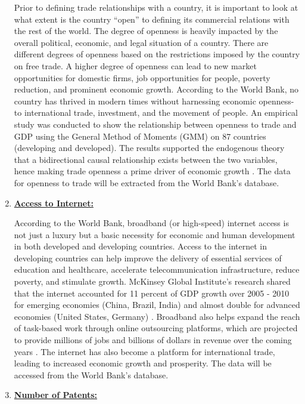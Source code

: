 \begin{enumerate}
Prior to defining trade relationships with a country, it is important to look at what extent is the country “open” to defining its commercial relations with the rest of the world. The degree of openness is heavily impacted by the overall political, economic, and legal situation of a country. There are different degrees of openness based on the restrictions imposed by the country on free trade. A higher degree of openness can lead to new market opportunities for domestic firms, job opportunities for people, poverty reduction, and prominent economic growth. According to the World Bank, no country has thrived in modern times without harnessing economic openness- to international trade, investment, and the movement of people. An empirical study was conducted to show the relationship between openness to trade and GDP using the General Method of Moments (GMM) on 87 countries (developing and developed). The results supported the endogenous theory that a bidirectional causal relationship exists between the two variables, hence making trade openness a prime driver of economic growth \cite{idris2016trade}. The data for openness to trade will be extracted from the World Bank’s database.

\item \underline{\textbf{Access to Internet:}}

According to the World Bank, broadband (or high-speed) internet access is not just a luxury but a basic necessity for economic and human development in both developed and developing countries. Access to the internet in developing countries can help improve the delivery of essential services of education and healthcare, accelerate telecommunication infrastructure, reduce poverty, and stimulate growth. McKinsey Global Institute’s research shared that the internet accounted for 11 percent of GDP growth over 2005 - 2010 for emerging economies (China, Brazil, India) and almost double for advanced economies (United States, Germany) \cite{manyika_roxburgh_2019}. Broadband also helps expand the reach of task-based work through online outsourcing platforms, which are projected to provide millions of jobs and billions of dollars in revenue over the coming years \cite{worldbank}. The internet has also become a platform for international trade, leading to increased economic growth and prosperity. The data will be accessed from the World Bank’s database.

\item \underline{\textbf{Number of Patents:}}


\end{enumerate}
